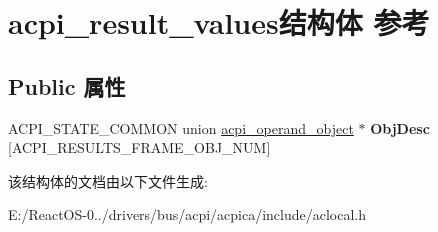 \hypertarget{structacpi__result__values}{}\section{acpi\+\_\+result\+\_\+values结构体 参考}
\label{structacpi__result__values}
\subsection*{Public 属性}
\begin{DoxyCompactItemize}
\item 
\mbox{\label{structacpi__result__values_af4724fcdc1e06dc8c331e8297674f335}} 
A\+C\+P\+I\+\_\+\+S\+T\+A\+T\+E\+\_\+\+C\+O\+M\+M\+ON union \hyperlink{unionacpi__operand__object}{acpi\+\_\+operand\+\_\+object} $\ast$ {\bfseries Obj\+Desc} \mbox{[}A\+C\+P\+I\+\_\+\+R\+E\+S\+U\+L\+T\+S\+\_\+\+F\+R\+A\+M\+E\+\_\+\+O\+B\+J\+\_\+\+N\+UM\mbox{]}
\end{DoxyCompactItemize}


该结构体的文档由以下文件生成\+:\begin{DoxyCompactItemize}
\item 
E\+:/\+React\+O\+S-\/0../drivers/bus/acpi/acpica/include/aclocal.\+h\end{DoxyCompactItemize}
